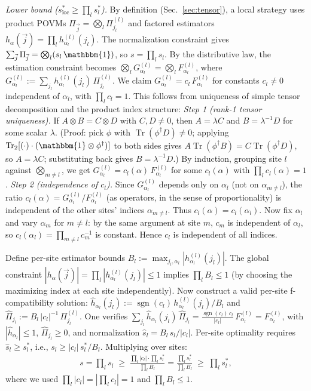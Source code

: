 \documentclass[aps,%
twocolumn,%
floatfix,%
pra,%
amsfonts,%
groupedaddress,%
superscriptaddress]{revtex4-2}%
\DeclareMathOperator{\tr}{Tr}
\DeclareMathOperator{\sgn}{sgn}
\newcommand{\ox}{\otimes}
\newcommand{\1}{\mathbbm{1}}
\begin{document}
\emph{Lower bound ($s^*_{\mathrm{loc}} \geq \prod_l s^*_l$).}
By definition (Sec.~\ref{sec:tensor}), a local strategy uses product POVMs $\Pi_{\vec{j}} = \bigotimes_l \Pi_{j_l}^{(l)}$ and factored estimators $h_\alpha(\vec{j}) = \prod_l h_{\alpha_l}^{(l)}(j_l)$.
The normalization constraint gives $\sum_{\vec{j}} \Pi_{\vec{j}} = \bigotimes_l (s_l\,\1)$, so $s = \prod_l s_l$.
By the distributive law, the estimation constraint becomes
$\bigotimes_l G_{\alpha_l}^{(l)} = \bigotimes_l F_{\alpha_l}^{(l)}$,
where $G_{\alpha_l}^{(l)} := \sum_{j_l} h_{\alpha_l}^{(l)}(j_l)\,\Pi_{j_l}^{(l)}$.
We claim $G_{\alpha_l}^{(l)} = c_l\,F_{\alpha_l}^{(l)}$ for constants $c_l \neq 0$ independent of $\alpha_l$, with $\prod_l c_l = 1$. This follows from uniqueness of simple tensor decomposition and the product index structure:
\emph{Step 1 (rank-1 tensor uniqueness).} If $A\ox B = C\ox D$ with $C,D \neq 0$, then $A = \lambda C$ and $B = \lambda^{-1}D$ for some scalar $\lambda$. (Proof: pick $\phi$ with $\tr(\phi^\dagger D) \neq 0$; applying $\tr_{2}[(\cdot)\cdot(\1\ox\phi^\dagger)]$ to both sides gives $A\tr(\phi^\dagger B) = C\tr(\phi^\dagger D)$, so $A = \lambda C$; substituting back gives $B = \lambda^{-1}D$.) By induction, grouping site $l$ against $\bigotimes_{m\neq l}$, we get $G_{\alpha_l}^{(l)} = c_l(\alpha)\,F_{\alpha_l}^{(l)}$ for some $c_l(\alpha)$ with $\prod_l c_l(\alpha) = 1$.
\emph{Step 2 (independence of $c_l$).} Since $G_{\alpha_l}^{(l)}$ depends only on $\alpha_l$ (not on $\alpha_{m\neq l}$), the ratio $c_l(\alpha) = G_{\alpha_l}^{(l)} / F_{\alpha_l}^{(l)}$ (as operators, in the sense of proportionality) is independent of the other sites' indices $\alpha_{m\neq l}$. Thus $c_l(\alpha) = c_l(\alpha_l)$. Now fix $\alpha_l$ and vary $\alpha_m$ for $m \neq l$: by the same argument at site $m$, $c_m$ is independent of $\alpha_l$, so $c_l(\alpha_l) = \prod_{m\neq l} c_m^{-1}$ is constant. Hence $c_l$ is independent of all indices.

Define per-site estimator bounds $B_l := \max_{j_l,\alpha_l} |h_{\alpha_l}^{(l)}(j_l)|$.
The global constraint $|h_\alpha(\vec{j})| = \prod_l |h_{\alpha_l}^{(l)}(j_l)| \leq 1$
implies $\prod_l B_l \leq 1$ (by choosing the maximizing index at each site independently).
Now construct a valid per-site f-compatibility solution:
$\hat{h}_{\alpha_l}(j_l) := \sgn(c_l)\,h_{\alpha_l}^{(l)}(j_l)/B_l$ and
$\hat{\Pi}_{j_l} := B_l\,|c_l|^{-1}\,\Pi_{j_l}^{(l)}$.
One verifies $\sum_{j_l} \hat{h}_{\alpha_l}(j_l)\,\hat{\Pi}_{j_l} = \frac{\sgn(c_l)\,c_l}{|c_l|}\,F_{\alpha_l}^{(l)} = F_{\alpha_l}^{(l)}$,
with $|\hat{h}_{\alpha_l}| \leq 1$, $\hat{\Pi}_{j_l} \geq 0$, and normalization $\hat{s}_l = B_l\,s_l/|c_l|$.
Per-site optimality requires $\hat{s}_l \geq s^*_l$, i.e., $s_l \geq |c_l|\,s^*_l/B_l$.
Multiplying over sites:
\begin{align}
s = \prod_l s_l \;\geq\; \frac{\prod_l |c_l| \cdot \prod_l s^*_l}{\prod_l B_l} = \frac{\prod_l s^*_l}{\prod_l B_l} \;\geq\; \prod_l s^*_l,
\end{align}
where we used $\prod_l |c_l| = |\prod_l c_l| = 1$ and $\prod_l B_l \leq 1$.
\end{document}
